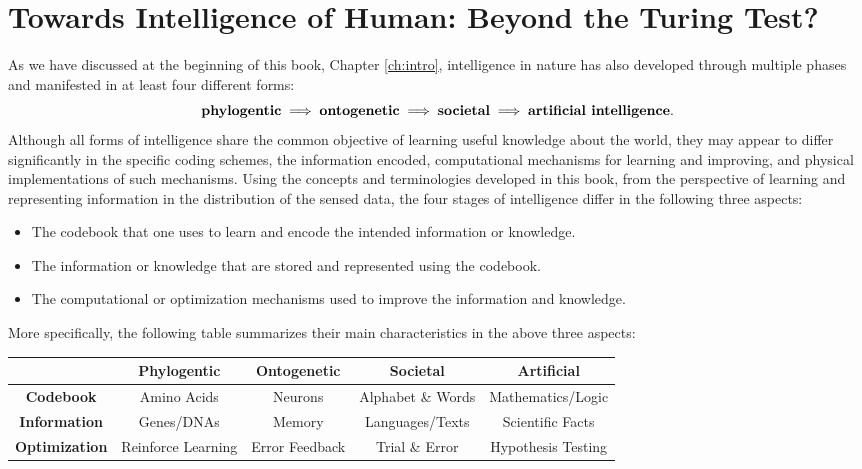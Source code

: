 \documentclass[\toplevelprefix/book-main.tex]{subfiles}
\begin{document}
\section{Towards Intelligence of Human: Beyond the Turing Test?}
As we have discussed at the beginning of this book, Chapter \ref{ch:intro}, intelligence in nature has also developed through multiple phases and manifested in at least four different forms:
\begin{equation}
\mbox{\textbf{phylogentic}} \;
   \Longrightarrow \; \mbox{\textbf{ontogenetic}} \; \Longrightarrow \; 
   \mbox{\textbf{societal}}
   \; \Longrightarrow \; 
   \mbox{\textbf{artificial intelligence}}.
\end{equation}
Although all forms of intelligence share the common objective of learning useful knowledge about the world, they may appear to differ significantly in the specific coding schemes, the information encoded, computational mechanisms for learning and improving, and physical implementations of such mechanisms. Using the concepts and terminologies developed in this book, from the perspective of learning and representing information in the distribution of the sensed data, the four stages of intelligence differ in the following three aspects:
\begin{itemize}
    \item The codebook that one uses to learn and encode the intended information or knowledge.
    \item The information or knowledge that are stored and  represented using the codebook. 
    \item The computational or optimization mechanisms used to improve the information and knowledge.
\end{itemize}
More specifically, the following table summarizes their main characteristics in the above three aspects:
\begin{center}
\begin{tabular}{| c | c | c | c | c |}
\hline & \textbf{Phylogentic} & \textbf{Ontogenetic} & \textbf{Societal} & \textbf{Artificial}\\
\hline
\textbf{Codebook}  & Amino Acids & Neurons & Alphabet \& Words & Mathematics/Logic \\ [0.5ex]
  \hline 
\textbf{Information} & Genes/DNAs & Memory & Languages/Texts & Scientific Facts\\ [0.5ex]
  \hline
\textbf{Optimization} & Reinforce Learning & Error Feedback & Trial \& Error & Hypothesis Testing \\  [0.5ex]
\hline
\end{tabular}
\end{center}
\end{document}
